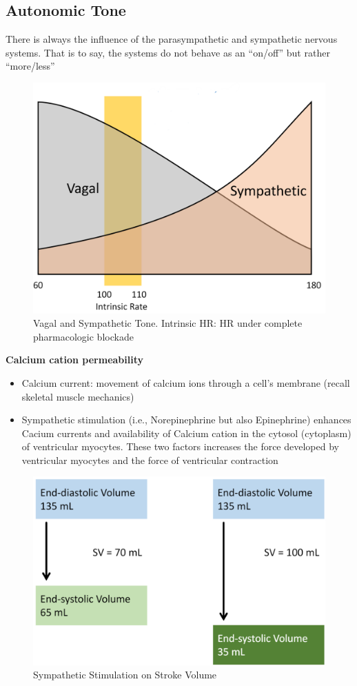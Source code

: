 \documentclass[11pt,fleqn]{book}
\begin{document}
\subsection{Autonomic Tone}
There is always the influence of the parasympathetic
and sympathetic nervous systems. That is to say, the
systems do not behave as an “on/off” but rather
“more/less”

\begin{figure}[h!]
\begin{center}
    \includegraphics[width=0.6\linewidth]{Pictures/Screenshot 2024-04-04 012358.png}
\end{center}
    \caption{Vagal and Sympathetic Tone. Intrinsic HR:
HR under
complete
pharmacologic
blockade
}
\end{figure}

\textbf{Calcium cation permeability}
\begin{itemize}
    \item Calcium current: movement of
calcium ions through a cell’s
membrane (recall skeletal
muscle mechanics)
    \item Sympathetic stimulation (i.e., Norepinephrine but
also Epinephrine) enhances Cacium currents and
availability of Calcium cation in the cytosol (cytoplasm) of
ventricular myocytes. These two factors increases the
force developed by ventricular myocytes and the
force of ventricular contraction
\end{itemize}


\begin{figure}[h!]
\begin{center}
    \includegraphics[width=0.6\linewidth]{Pictures/Screenshot 2024-04-04 012811.png}
\end{center}
    \caption{Sympathetic Stimulation on
Stroke Volume
}
\end{figure}
\end{document}
